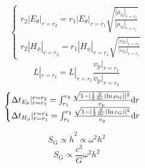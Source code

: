 \begin{equation}
    \begin{cases}
        r_2\left\lvert {E}_\theta\right\rvert_{r=r_2}=r_1\left\lvert {E}_\theta\right\rvert_{r=r_1}\sqrt{\frac{\left\lvert \mu_{\text{G}}\right\rvert_{r=r_2}}{\left\lvert \mu_{\text{G}}\right\rvert_{r=r_1}}}\\
        r_2\left\lvert {H}_\phi\right\rvert_{r=r_2}=r_1\left\lvert {H}_\phi\right\rvert_{r=r_1}\sqrt{\frac{\left\lvert \varepsilon_{\text{G}}\right\rvert_{r=r_2}}{\left\lvert \varepsilon_{\text{G}}\right\rvert_{r=r_1}}}
    \end{cases}
\end{equation}
\begin{equation}
    L|_{r=r_2}=L|_{r=r_1}\frac{v_\text{p}|_{r=r_1}}{v_\text{p}|_{r=r_2}}
\end{equation}
\begin{equation}
    \begin{cases}
        \Delta t_{{E}_\theta}|_{r=r_1}^{r=r_2}=\int_{r_1}^{r_2}\frac{\sqrt{1-[\frac{1}{2}\frac{\partial}{\partial r}(\ln\mu_{\text{G}})]^2}}{v_\text{p}}\mathrm{d} r\\
        \Delta t_{{H}_\phi}|_{r=r_1}^{r=r_2}=\int_{r_1}^{r_2}\frac{\sqrt{1-[\frac{1}{2}\frac{\partial}{\partial r}(\ln\varepsilon_{\text{G}})]^2}}{v_\text{p}}\mathrm{d} r\\
    \end{cases}
\end{equation}

\begin{equation}
    S_\text{G}\propto\dot{h}^2\propto\omega^2 h^2
\end{equation}
\begin{equation}
    S_\text{G}\propto\frac{c^3}{G}\omega^2h^2
\end{equation}

